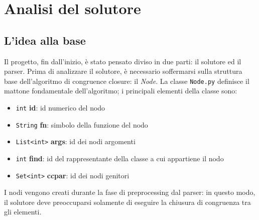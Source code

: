 \chapter{Analisi del solutore}
\section{L'idea alla base}
Il progetto, fin dall'inizio, è stato pensato diviso in due parti: il solutore ed il parser.
Prima di analizzare il solutore, è necessario soffermarsi sulla struttura base dell'algoritmo
di congruence closure: il \textit{Node}. La classe \texttt{Node.py} definisce il mattone fondamentale
dell'algoritmo; i principali elementi della classe sono:
\begin{itemize}
    \item \texttt{int} \textbf{id}: id numerico del nodo
    \item \texttt{String} \textbf{fn}: simbolo della funzione del nodo
    \item \texttt{List<int>} \textbf{args}: id dei nodi argomenti
    \item \texttt{int} \textbf{find}: id del rappresentante della classe a cui appartiene il nodo
    \item \texttt{Set<int>} \textbf{ccpar}: id dei nodi genitori
\end{itemize}
I nodi vengono creati durante la fase di preprocessing dal parser: in questo modo, il solutore
deve preoccuparsi solamente di eseguire la chiusura di congruenza tra gli elementi.
